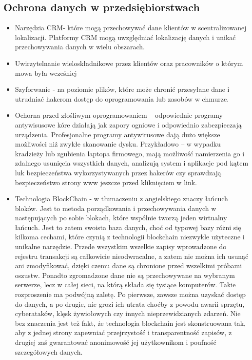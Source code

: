 \documentclass[12pt,a4paper]{article}
\begin{document}
\subsection{Ochrona danych w przedsiębiorstwach }

\begin{itemize}
\item Narzędzia CRM- które mogą przechowywać dane klientów w scentralizowanej lokalizacji. Platformy CRM mogą uwzględniać lokalizację danych i unikać przechowywania danych w wielu obszarach. 
\item Uwirzytelnanie wieloskładnikowe przez klientów oraz pracowników o którym mowa była wcześniej 
\item Szyforwanie - na poziomie plików, które może chronić przesyłane dane i utrudniać hakerom dostęp do oprogramowania lub zasobów w chmurze. 
\item Ochorna przed złośliwym oprogramowaniem – odpowiednie programy antywisusowe kóre działają jak zapory ogniowe i odpowiednio zabezpieczają urządzenia. Profesjonalne programy antywirusowe dają dużo większe możliwości niż zwykłe skanowanie dysku. Przykładowo – w wypadku kradzieży lub zgubienia laptopa firmowego, mają możliwość namierzenia go i zdalnego usunięcia wszystkich danych, analizują system i aplikacje pod kątem luk bezpieczeństwa wykorzystywanych przez hakerów czy sprawdzają bezpieczeństwo strony www jeszcze przed kliknięciem w link. 
\item Technologia BlockChain - w tłumaczeniu z angielskiego znaczy łańcuch bloków. Jest to metoda porządkowania i przechowywania danych w następujących po sobie blokach, które wspólnie tworzą jeden wirtualny łańcuch. Jest to zatem swoista baza danych, choć od typowej bazy różni się kilkoma cechami, które czynią z technologii blockchain niezwykle użyteczne i unikalne narzędzie. Przede wszystkim wszelkie zapisy wprowadzone do rejestru transakcji są całkowicie nieodwracalne, a zatem nie można ich usunąć ani zmodyfikować, dzięki czemu dane są chronione przed wszelkimi próbami oszustw. Ponadto zgromadzone dane nie są przechowywane na wybranym serwerze, lecz w całej sieci, na którą składa się tysiące komputerów. Takie rozproszenie ma podwójną zaletę. Po pierwsze, zawsze można uzyskać dostęp do danych, a po drugie, nie grozi ich utrata choćby z powodu awarii sprzętu, cyberataków, klęsk żywiołowych czy innych nieprzewidzianych zdarzeń. Nie bez znaczenia jest też fakt, że technologia blockchain jest skonstruowana tak, aby z jednej strony zapewniać przejrzystość i transparentność zapisów, z drugiej zaś gwarantować anonimowość jej użytkownikom i poufność szczegółowych danych.   
\end{itemize}
\end{document}
